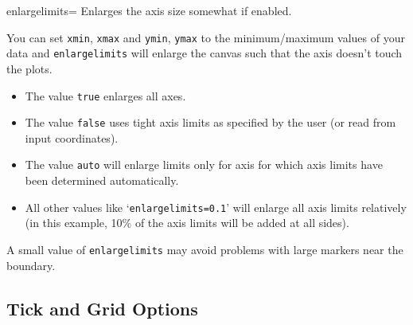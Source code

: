 \begin{pgfplotskey}{enlargelimits=}
Enlarges the axis size somewhat if enabled.

You can set \texttt{xmin}, \texttt{xmax} and \texttt{ymin}, \texttt{ymax} to the minimum/maximum values of your data and \texttt{enlargelimits} will enlarge the canvas such that the axis doesn't touch the plots.

\begin{itemize}
	\item The value \texttt{true} enlarges all axes.
	\item The value \texttt{false} uses tight axis limits as specified by the user (or read from input coordinates).
	\item The value \texttt{auto} will enlarge limits only for axis for which axis limits have been determined automatically.
	\item All other values like `\texttt{enlargelimits=0.1}' will enlarge all axis limits relatively (in this example, 10\% of the axis limits will be added at all sides).
\end{itemize}
A small value of \texttt{enlargelimits} may avoid problems with large markers near the boundary.
\end{pgfplotskey}


\subsection{Tick and Grid Options}

